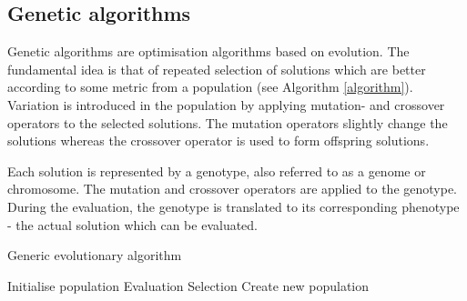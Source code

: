 \subsection{Genetic algorithms}

Genetic algorithms are optimisation algorithms based on evolution. The fundamental idea is that
of repeated selection of solutions which are better according to some metric from a population (see Algorithm \ref{algorithm}).
Variation is introduced in the population by applying mutation- and crossover operators to the
selected solutions. The mutation operators slightly change the solutions whereas the crossover
operator is used to form offspring solutions.

Each solution is represented by a genotype, also referred to as a genome or chromosome.
The mutation and crossover operators are applied to the genotype. During the evaluation, the
genotype is translated to its corresponding phenotype - the actual solution which can be evaluated.


\begin{algorithm}[H]
    \caption{Generic evolutionary algorithm}
    \begin{algorithmic}

    \State Initialise population
        \State Evaluation 
        \State Selection  
        \State Create new population 
    \EndWhile
\EndProcedure

\end{algorithmic}
\label{algorithm}
\end{algorithm}
